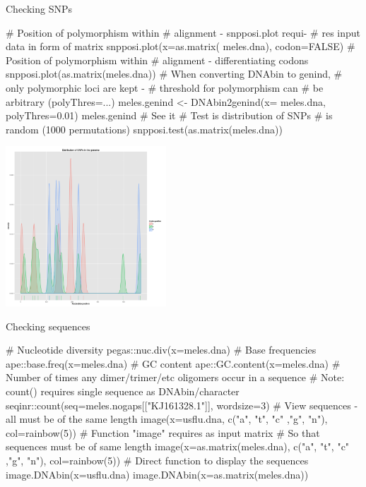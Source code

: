 \documentclass[compress, ucs, xelatex, 11pt, xcolor=svgnames,
  hyperref={
    bookmarks=true,
    unicode=true,
    colorlinks=true,
    pdftitle={Molecular data in R},
    plainpages=false,
    pdfauthor={Vojtech Zeisek},
    pdfsubject={Course about phylogeny and evolution in R},
    pdfcreator={XeLaTeX},
    pdfkeywords={R, evolution, phylogeny, molecular data},
    linkcolor=Tomato,
    anchorcolor=SaddleBrown,
    citecolor=Goldenrod,
    filecolor=DarkMagenta,
    menucolor=Sienna,
    urlcolor=DarkTurquoise,
    pdftex},
  url={hyphens, lowtilde} %
  ]{beamer}
\begin{document}
\begin{frame}[fragile]{Checking SNPs}
\begin{multicols}{2}
  \begin{spluscode}
    # Position of polymorphism within
    # alignment - snpposi.plot requi-
    # res input data in form of matrix
    snpposi.plot(x=as.matrix(
      meles.dna), codon=FALSE)
    # Position of polymorphism within
    # alignment - differentiating codons
    snpposi.plot(as.matrix(meles.dna))
    # When converting DNAbin to genind,
    # only polymorphic loci are kept -
    # threshold for polymorphism can
    # be arbitrary (polyThres=...)
    meles.genind <- DNAbin2genind(x=
      meles.dna, polyThres=0.01)
    meles.genind # See it
    # Test is distribution of SNPs
    # is random (1000 permutations)
    snpposi.test(as.matrix(meles.dna))
  \end{spluscode}
  \begin{flushright}
    \includegraphics[height=6cm]{snpposi.png}
  \end{flushright}
\end{multicols}
\end{frame}

\begin{frame}[fragile]{Checking sequences}
  \begin{spluscode}
    # Nucleotide diversity
    pegas::nuc.div(x=meles.dna)
    # Base frequencies
    ape::base.freq(x=meles.dna)
    # GC content
    ape::GC.content(x=meles.dna)
    # Number of times any dimer/trimer/etc oligomers occur in a sequence
    # Note: count() requires single sequence as DNAbin/character
    seqinr::count(seq=meles.nogaps[["KJ161328.1"]], wordsize=3)
    # View sequences - all must be of the same length
    image(x=usflu.dna, c("a", "t", "c" ,"g", "n"), col=rainbow(5))
    # Function "image" requires as input matrix
    # So that sequences must be of same length
    image(x=as.matrix(meles.dna), c("a", "t", "c" ,"g", "n"),
      col=rainbow(5))
    # Direct function to display the sequences
    image.DNAbin(x=usflu.dna)
    image.DNAbin(x=as.matrix(meles.dna))
  \end{spluscode}
\end{frame}
\end{document}
